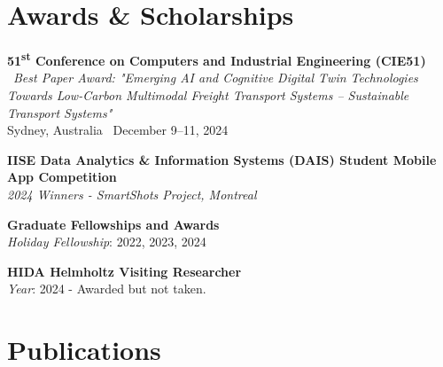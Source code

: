 \documentclass[10pt, letterpaper]{article}
\begin{document}
        \section*{Awards \& Scholarships}


        \noindent \textbf{51\textsuperscript{st} Conference on Computers and Industrial Engineering (CIE51)} \ \textit{Best Paper Award: "Emerging AI and Cognitive Digital Twin Technologies Towards Low-Carbon Multimodal Freight Transport Systems – Sustainable Transport Systems"} \\ Sydney, Australia \  December 9–11, 2024 \
        \vspace{0.5em}


        \noindent \textbf{IISE Data Analytics \& Information Systems (DAIS) Student Mobile App Competition} \\
        \textit{2024 Winners - SmartShots Project, Montreal} \\
        
        \vspace{0.5em} %
        
        \noindent \textbf{Graduate Fellowships and Awards} \\
        \textit{Holiday Fellowship}: 2022, 2023, 2024 \\
        
        \vspace{0.5em} %
        
        \noindent \textbf{HIDA Helmholtz Visiting Researcher} \\
        \textit{Year}: 2024 - Awarded but not taken.

        



\section*{Publications}
\end{document}
